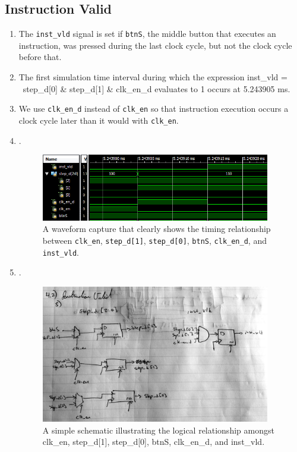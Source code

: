 \documentclass[]{article}
\begin{document}
\subsection{Instruction Valid}
\begin{enumerate}
\item The \texttt{inst\_vld} signal is set if \texttt{btnS}, the middle button that executes an instruction, was pressed during the last clock cycle, but not the clock cycle before that.
\item The first simulation time interval during which the expression inst\_vld = ~step\_d[0] \& step\_d[1] \& clk\_en\_d evaluates to 1 occurs at 5.243905 ms.
\item We use \texttt{clk\_en\_d} instead of \texttt{clk\_en} so that instruction execution occurs a clock cycle later than it would with \texttt{clk\_en}.
\item . %
\begin{figure}[H]
\centering
\includegraphics[width=10cm]{inst_vld.PNG}
\caption{A waveform capture that clearly shows the timing relationship between  \texttt{clk\_en}, \texttt{step\_d[1]}, \texttt{step\_d[0]}, \texttt{btnS}, \texttt{clk\_en\_d}, and \texttt{inst\_vld}.}
\end{figure}
\item . %
\begin{figure}[h]
\centering
\includegraphics[width=10cm]{inst_vld.jpg}
\caption{A simple schematic illustrating the logical relationship amongst clk\_en, step\_d[1], step\_d[0], btnS, clk\_en\_d, and inst\_vld.}
\end{figure}
\end{enumerate}
\end{document}

